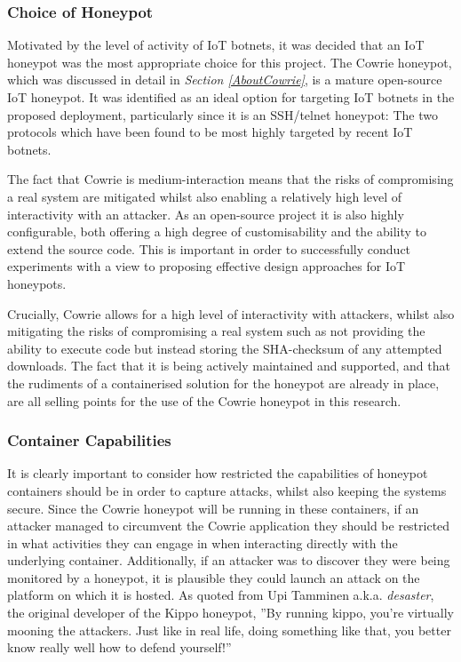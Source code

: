 \subsubsection{Choice of Honeypot}
Motivated by the level of activity of IoT botnets, it was decided that an IoT honeypot was the most appropriate choice for this project. The Cowrie honeypot, which was discussed in detail in \textit{Section \ref{AboutCowrie}}, is a mature open-source IoT honeypot. It was identified as an ideal option for targeting IoT botnets in the proposed deployment, particularly since it is an SSH/telnet honeypot: The two protocols which have been found to be most highly targeted by recent IoT botnets. \cite{UnderstandingTheMiraiBotnet} \cite{HajimeMysteriousBotnet}

The fact that Cowrie is medium-interaction means that the risks of compromising a real system are mitigated whilst also enabling a relatively high level of interactivity with an attacker. As an open-source project it is also highly configurable, both offering a high degree of customisability and the ability to extend the source code. This is important in order to successfully conduct experiments with a view to proposing effective design approaches for IoT honeypots.

Crucially, Cowrie allows for a high level of interactivity with attackers, whilst also mitigating the risks of compromising a real system such as not providing the ability to execute code but instead storing the SHA-checksum of any attempted downloads. The fact that it is being actively maintained and supported, and that the rudiments of a containerised solution for the honeypot are already in place, are all selling points for the use of the Cowrie honeypot in this research.
        

        
\subsubsection{Container Capabilities}
		It is clearly important to consider how restricted the capabilities of honeypot containers should be in order to capture attacks, whilst also keeping the systems secure. Since the Cowrie honeypot will be running in these containers, if an attacker managed to circumvent the Cowrie application they should be restricted in what activities they can engage in when interacting directly with the underlying container. Additionally, if an attacker was to discover they were being monitored by a honeypot, it is plausible they could launch an attack on the platform on which it is hosted. As quoted from Upi Tamminen a.k.a. \textit{desaster}, the original developer of the Kippo honeypot, ''By running kippo, you're virtually mooning the attackers. Just like in real life, doing something like that, you better know really well how to defend yourself!'' \cite{DesasterQuoteKippo} 
        
